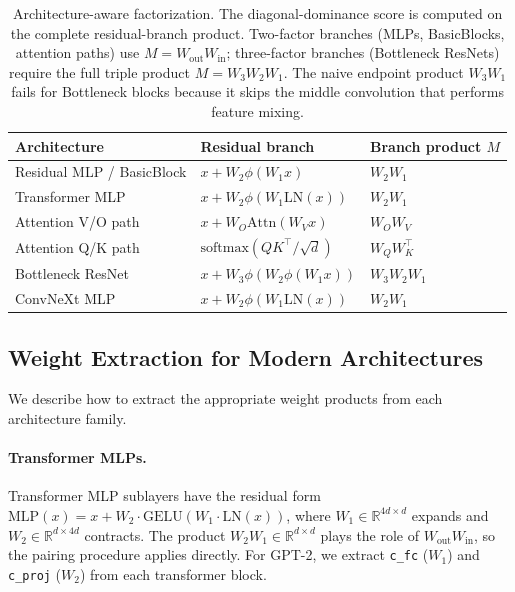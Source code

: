 \documentclass[wcp]{jmlr}
\begin{document}
\begin{table}[t]
\centering
\small
\begin{tabular}{lll}
\toprule
Architecture & Residual branch & Branch product $M$ \\
\midrule
Residual MLP / BasicBlock & $x + W_2 \phi(W_1 x)$ & $W_2 W_1$ \\
Transformer MLP & $x + W_2 \phi(W_1 \mathrm{LN}(x))$ & $W_2 W_1$ \\
Attention V/O path & $x + W_O \mathrm{Attn}(W_V x)$ & $W_O W_V$ \\
Attention Q/K path & $\mathrm{softmax}(Q K^\top / \sqrt{d})$ & $W_Q W_K^\top$ \\
Bottleneck ResNet & $x + W_3 \phi(W_2 \phi(W_1 x))$ & $W_3 W_2 W_1$ \\
ConvNeXt MLP & $x + W_2 \phi(W_1 \mathrm{LN}(x))$ & $W_2 W_1$ \\
\bottomrule
\end{tabular}
\caption{Architecture-aware factorization. The diagonal-dominance score is computed on the complete residual-branch product. Two-factor branches (MLPs, BasicBlocks, attention paths) use $M = W_{\mathrm{out}} W_{\mathrm{in}}$; three-factor branches (Bottleneck ResNets) require the full triple product $M = W_3 W_2 W_1$. The naive endpoint product $W_3 W_1$ fails for Bottleneck blocks because it skips the middle convolution that performs feature mixing.}
\label{tab:factorization}
\end{table}

\subsection{Weight Extraction for Modern Architectures}\label{sec:architectures}

We describe how to extract the appropriate weight products from each architecture family.

\paragraph{Transformer MLPs.} Transformer MLP sublayers have the residual form $\mathrm{MLP}(x) = x + W_2 \cdot \mathrm{GELU}(W_1 \cdot \mathrm{LN}(x))$, where $W_1 \in \mathbb{R}^{4d \times d}$ expands and $W_2 \in \mathbb{R}^{d \times 4d}$ contracts. The product $W_2 W_1 \in \mathbb{R}^{d \times d}$ plays the role of $W_{\mathrm{out}} W_{\mathrm{in}}$, so the pairing procedure applies directly. For GPT-2, we extract \texttt{c\_fc} ($W_1$) and \texttt{c\_proj} ($W_2$) from each transformer block.
\end{document}
